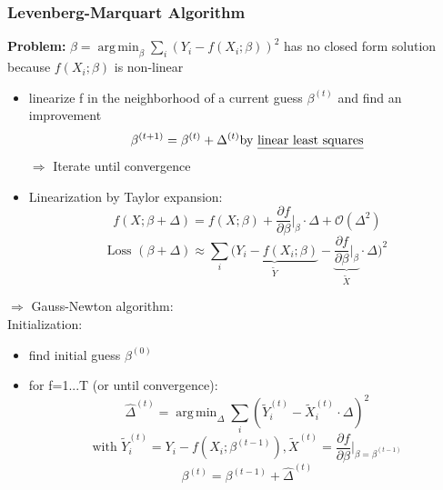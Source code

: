 \documentclass[11pt]{article}
\DeclareMathOperator*{\argmin}{arg\,min}
\begin{document}
    \subsubsection{Levenberg-Marquart Algorithm}
    \textbf{Problem: } $\hat{\beta}=\argmin_\beta \sum_i (Y_i-f(X_i;\beta))^2$
    has no closed form solution because $f(X_i;\beta)$ is non-linear
    \begin{itemize}
      \item linearize f in the neighborhood of a current guess $\beta^{(t)}$ and
      find an improvement
      \begin{equation*}
        \beta^{(t+1)}=\beta^{(t)}+\Delta^{(t)} \text{by \underline{linear least squares}}
      \end{equation*}
      $\Rightarrow$ Iterate until convergence
      \item Linearization by Taylor expansion:
      \begin{equation*}
        f(X;\beta+\Delta) = f(X;\beta)+\frac{\partial f}{\partial \beta} \bigg \vert_\beta
        \cdot \Delta + \mathcal{O}(\Delta^2)
      \end{equation*}
      \begin{equation*}
        \text{Loss } (\beta+\Delta) \approx \sum_i \underbrace{(Y_i-f(X_i;\beta)}_{\tilde{Y}}-
        \underbrace{\frac{\partial f}{\partial \beta} \bigg \vert_\beta}_{\tilde{X}} \cdot \Delta)^2
      \end{equation*}
    \end{itemize}
    $\Rightarrow$ Gauss-Newton algorithm: \\
    Initialization:
    \begin{itemize}
      \item find initial guess $\beta^{(0)}$
      \item for f=1...T (or until convergence):
      \begin{equation*}
        \hat{\Delta}^{(t)} = \argmin_{\Delta} \sum_i (\tilde{Y}_i^{(t)}-\tilde{X}_i^{(t)} \cdot \Delta)^2
      \end{equation*}
      \begin{equation*}
        \text{with } \tilde{Y}_i^{(t)}=Y_i-f(X_i;\beta^{(t-1)}), \tilde{X}^{(t)}=
        \frac{\partial f}{\partial \beta} \bigg \vert_{\beta=\beta^{(t-1)}}
      \end{equation*}
      \begin{equation*}
        \beta^{(t)}=\beta^{(t-1)}+\hat{\Delta}^{(t)}
      \end{equation*}
    \end{itemize}
\end{document}
